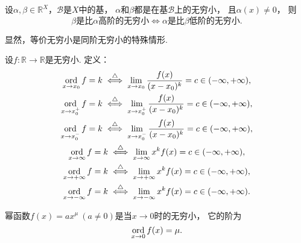 \begin{proposition}
设\(\alpha,\beta\in\mathbb{R}^X\)，\(\mathcal{B}\)是\(X\)中的基，
\(\alpha\)和\(\beta\)都是在基\(\mathcal{B}\)上的无穷小，
且\(\alpha(x)\neq0\)，
则\[
	\text{\(\beta\)是比\(\alpha\)高阶的无穷小}
	\iff
	\text{\(\alpha\)是比\(\beta\)低阶的无穷小}.
\]
\end{proposition}

\begin{remark}
显然，等价无穷小是同阶无穷小的特殊情形.
\end{remark}

\begin{definition}
设\(f\colon\mathbb{R}\to\mathbb{R}\)是无穷小.
定义：\begin{gather*}
	\operatorname*{ord}_{x \to x_0} f = k
	\overset{\triangle}{\iff}
	\lim_{x \to x_0} \frac{f(x)}{(x-x_0)^k} = c \in (-\infty,+\infty), \\
	\operatorname*{ord}_{x \to x_0^+} f = k
	\overset{\triangle}{\iff}
	\lim_{x \to x_0^+} \frac{f(x)}{(x-x_0)^k} = c \in (-\infty,+\infty), \\
	\operatorname*{ord}_{x \to x_0^-} f = k
	\overset{\triangle}{\iff}
	\lim_{x \to x_0^-} \frac{f(x)}{(x-x_0)^k} = c \in (-\infty,+\infty), \\
	\operatorname*{ord}_{x \to \infty} f = k
	\overset{\triangle}{\iff}
	\lim_{x \to \infty} x^k f(x) = c \in (-\infty,+\infty), \\
	\operatorname*{ord}_{x \to +\infty} f = k
	\overset{\triangle}{\iff}
	\lim_{x \to +\infty} x^k f(x) = c \in (-\infty,+\infty), \\
	\operatorname*{ord}_{x \to -\infty} f = k
	\overset{\triangle}{\iff}
	\lim_{x \to -\infty} x^k f(x) = c \in (-\infty,+\infty).
\end{gather*}
\end{definition}
\begin{example}
幂函数\(f(x) = a x^\mu\ (a\neq0)\)是当\(x\to0\)时的无穷小，
它的阶为\[
	\operatorname*{ord}_{x\to0} f(x) = \mu.
\]
\end{example}

